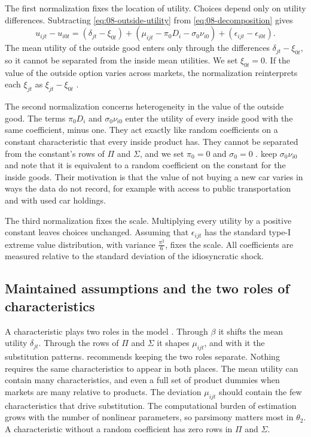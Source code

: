 The first normalization fixes the location of utility. Choices depend only on utility differences. Subtracting
\eqref{eq:08-outside-utility} from \eqref{eq:08-decomposition} gives
\begin{equation*}
  u_{ijt} - u_{i0t} = (\delta_{jt} - \xi_{0t}) + (\mu_{ijt} - \pi_0 D_i - \sigma_0\nu_{i0})
                     + (\epsilon_{ijt} - \epsilon_{i0t}).
\end{equation*}
The mean utility of the outside good enters only through the differences $\delta_{jt} - \xi_{0t}$, so it
cannot be separated from the inside mean utilities. We set $\xi_{0t} = 0$. If the value of the outside option
varies across markets, the normalization reinterprets each $\xi_{jt}$ as $\xi_{jt} - \xi_{0t}$
\citep[n.~12]{BerryHaile2014}.

The second normalization concerns heterogeneity in the value of the outside good. The terms $\pi_0 D_i$ and
$\sigma_0\nu_{i0}$ enter the utility of every inside good with the same coefficient, minus one. They act
exactly like random coefficients on a constant characteristic that every inside product has. They cannot be
separated from the constant's rows of $\Pi$ and $\Sigma$, and we set $\pi_0 = 0$ and $\sigma_0 = 0$
\citep[p.~520]{Nevo2000a}. \citet[p.~849, n.~6]{BerryLevinsohnPakes1995} keep $\sigma_0\nu_{i0}$ and note that it
is equivalent to a random coefficient on the constant for the inside goods. Their motivation is that the value
of not buying a new car varies in ways the data do not record, for example with access to public
transportation and with used car holdings.

The third normalization fixes the scale. Multiplying every utility by a positive constant leaves choices
unchanged. Assuming that $\epsilon_{ijt}$ has the standard type-I extreme value distribution, with variance
$\frac{\pi^2}{6}$, fixes the scale. All coefficients are measured relative to the standard deviation of the
idiosyncratic shock.

\subsection{Maintained assumptions and the two roles of characteristics}\label{sec:08-assumptions}

A characteristic plays two roles in the model \citep[p.~527]{Nevo2000a}. Through $\beta$ it shifts the mean
utility $\delta_{jt}$. Through the rows of $\Pi$ and $\Sigma$ it shapes $\mu_{ijt}$, and with it the
substitution patterns. \citeauthor{Nevo2000a} recommends keeping the two roles separate. Nothing requires the
same characteristics to appear in both places. The mean utility can contain many characteristics, and even a
full set of product dummies when markets are many relative to products. The deviation $\mu_{ijt}$ should
contain the few characteristics that drive substitution. The computational burden of estimation grows with
the number of nonlinear parameters, so parsimony matters most in $\theta_2$. A characteristic without a random
coefficient has zero rows in $\Pi$ and $\Sigma$.

